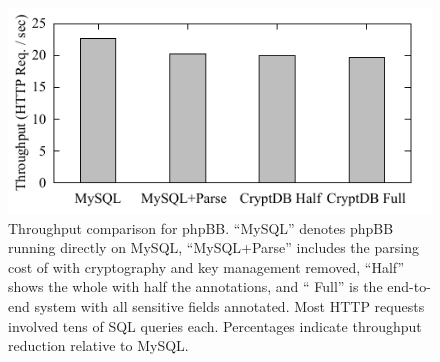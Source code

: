 


\begin{figure}[t]
\centering
\includegraphics{fig/tputbars.pdf} 
\caption{Throughput comparison for phpBB\@. ``MySQL'' denotes phpBB
running directly on MySQL, ``MySQL+Parse'' includes the parsing cost
of \name{} with cryptography and key management removed, ``\name Half''
shows the whole \name{} with half the annotations, and ``\name{} Full''
is the end-to-end system with all sensitive fields annotated.  Most
HTTP requests involved tens of SQL queries each.  Percentages indicate
throughput reduction relative to MySQL\@.}

\label{fig:appstput}
\end{figure}






